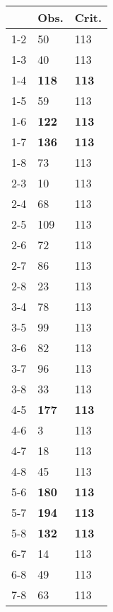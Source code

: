 \begin{table}[ht]
\centering
\begin{tabular}{rll}
  \hline
 & Obs. & Crit. \\ 
  \hline
1-2 & 50 & 113 \\ 
  1-3 & 40 & 113 \\ 
  1-4 & \textbf{118} & \textbf{113} \\ 
  1-5 & 59 & 113 \\ 
  1-6 & \textbf{122} & \textbf{113} \\ 
  1-7 & \textbf{136} & \textbf{113} \\ 
  1-8 & 73 & 113 \\ 
  2-3 & 10 & 113 \\ 
  2-4 & 68 & 113 \\ 
  2-5 & 109 & 113 \\ 
  2-6 & 72 & 113 \\ 
  2-7 & 86 & 113 \\ 
  2-8 & 23 & 113 \\ 
  3-4 & 78 & 113 \\ 
  3-5 & 99 & 113 \\ 
  3-6 & 82 & 113 \\ 
  3-7 & 96 & 113 \\ 
  3-8 & 33 & 113 \\ 
  4-5 & \textbf{177} & \textbf{113} \\ 
  4-6 & 3 & 113 \\ 
  4-7 & 18 & 113 \\ 
  4-8 & 45 & 113 \\ 
  5-6 & \textbf{180} & \textbf{113} \\ 
  5-7 & \textbf{194} & \textbf{113} \\ 
  5-8 & \textbf{132} & \textbf{113} \\ 
  6-7 & 14 & 113 \\ 
  6-8 & 49 & 113 \\ 
  7-8 & 63 & 113 \\ 
   \hline
\end{tabular}
\end{table}
